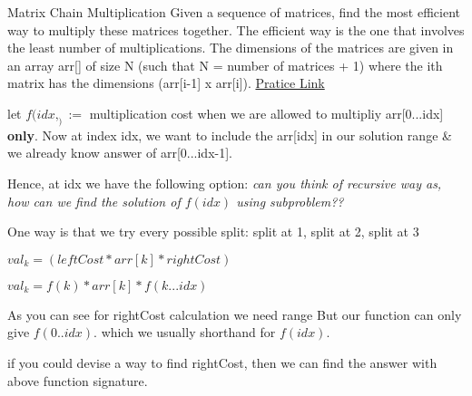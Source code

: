 \begin{problem}{Matrix Chain Multiplication}
    Given a sequence of matrices, find the most efficient way to multiply these matrices together. The efficient way is the one that involves the least number of multiplications.
    The dimensions of the matrices are given in an array arr[] of size N (such that N = number of matrices + 1) where the ith matrix has the dimensions (arr[i-1] x arr[i]).
    \href{https://practice.geeksforgeeks.org/problems/matrix-chain-multiplication0303/1}{Pratice Link}
\end{problem}

\begin{solution}[Discuss]
    let $f(idx,_):= $ multiplication cost when we are allowed to multipliy arr[0...idx] \textbf{only}.
    Now at index idx, we want to include the arr[idx] in our solution range \& we already know answer of arr[0...idx-1].

    Hence, at idx we have the following option:
    \textit{can you think of recursive way as, how can we find the solution of $f(idx)$ using subproblem??}

    One way is that we try every possible split: 
    split at 1, split at 2, split at 3 

    $ val_k =( leftCost * arr[k] * rightCost )$

    
    $ val_k = f(k)*arr[k]* f(k...idx) $
    
    As you can see for rightCost calculation we need range 
    But our function can only give $f(0..idx)$.  which we usually shorthand for $f(idx)$.

    if you could devise a way to find rightCost, then we can find the answer with above function signature.


\end{solution}

